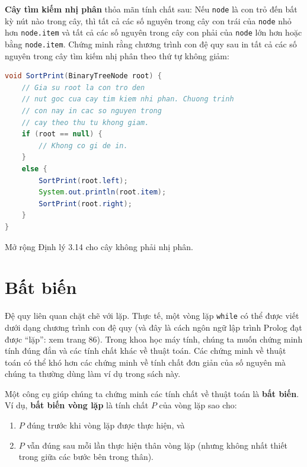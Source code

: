 \begin{exercise}
\textbf{Cây tìm kiếm nhị phân} thỏa mãn tính chất sau: Nếu \texttt{node} là con trỏ đến bất kỳ nút nào trong cây, thì tất cả các số nguyên trong cây con trái của \texttt{node} nhỏ hơn \texttt{node.item} và tất cả các số nguyên trong cây con phải của \texttt{node} lớn hơn hoặc bằng \texttt{node.item}. Chứng minh rằng chương trình con đệ quy sau in tất cả các số nguyên trong cây tìm kiếm nhị phân theo thứ tự không giảm:
\begin{lstlisting}[language=Java]
void SortPrint(BinaryTreeNode root) {
    // Gia su root la con tro den
    // nut goc cua cay tim kiem nhi phan. Chuong trinh
    // con nay in cac so nguyen trong
    // cay theo thu tu khong giam.
    if (root == null) {
        // Khong co gi de in.
    }
    else {
        SortPrint(root.left);
        System.out.println(root.item);
        SortPrint(root.right);
    }
}
\end{lstlisting}
\end{exercise}

\begin{exercise}
Mở rộng Định lý 3.14 cho cây không phải nhị phân.
\end{exercise}

\section{Bất biến}

Đệ quy liên quan chặt chẽ với lặp. Thực tế, một vòng lặp \texttt{while} có thể được viết dưới dạng chương trình con đệ quy (và đây là cách ngôn ngữ lập trình Prolog đạt được ``lặp'': xem trang 86). Trong khoa học máy tính, chúng ta muốn chứng minh tính đúng đắn và các tính chất khác về thuật toán. Các chứng minh về thuật toán có thể khó hơn các chứng minh về tính chất đơn giản của số nguyên mà chúng ta thường dùng làm ví dụ trong sách này.

Một công cụ giúp chúng ta chứng minh các tính chất về thuật toán là \textbf{bất biến}. Ví dụ, \textbf{bất biến vòng lặp} là tính chất $P$ của vòng lặp sao cho:
\begin{enumerate}
\item $P$ đúng trước khi vòng lặp được thực hiện, và
\item $P$ vẫn đúng sau mỗi lần thực hiện thân vòng lặp (nhưng không nhất thiết trong giữa các bước bên trong thân).
\end{enumerate}


